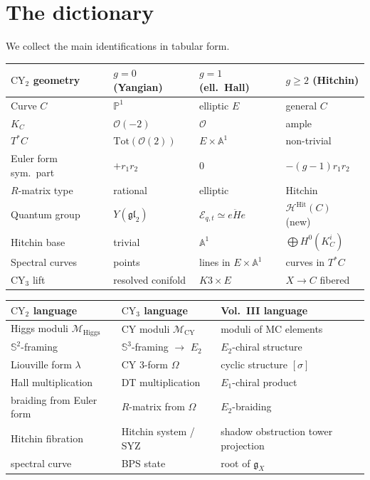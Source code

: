 \documentclass[11pt]{article}
\theoremstyle{garamondthm}
\theoremstyle{garamonddef}
\theoremstyle{garamondrem}
\newcommand{\CY}{\mathrm{CY}}
\newcommand{\Eone}{E_1}
\newcommand{\Etwo}{E_2}
\newcommand{\cE}{\mathcal{E}}
\newcommand{\cH}{\mathcal{H}}
\newcommand{\cM}{\mathcal{M}}
\newcommand{\cO}{\mathcal{O}}
\newcommand{\frakg}{\mathfrak{g}}
\newcommand{\Higgs}{\mathrm{Higgs}}
\newcommand{\Hit}{\mathrm{Hit}}
\newcommand{\Tot}{\mathrm{Tot}}
\begin{document}

\section{The dictionary}
\label{sec:dictionary}

We collect the main identifications in tabular form.

\begin{center}
\renewcommand{\arraystretch}{1.3}
\begin{tabular}{p{3cm}|p{3cm}|p{3cm}|p{3cm}}
\textbf{$\CY_2$ geometry} & \textbf{$g = 0$ (Yangian)} & \textbf{$g = 1$ (ell.\ Hall)} & \textbf{$g \geq 2$ (Hitchin)} \\ \hline
Curve $C$ & $\mathbb{P}^1$ & elliptic $E$ & general $C$ \\
$K_C$ & $\cO(-2)$ & $\cO$ & ample \\
$T^*C$ & $\Tot(\cO(2))$ & $E \times \mathbb{A}^1$ & non-trivial \\
Euler form sym.\ part & $+r_1 r_2$ & $0$ & $-(g{-}1)r_1 r_2$ \\
$R$-matrix type & rational & elliptic & Hitchin \\
Quantum group & $Y(\mathfrak{gl}_2)$ & $\cE_{q,t} \simeq e\ddot{H}e$ & $\cH^{\Hit}(C)$ (new) \\
Hitchin base & trivial & $\mathbb{A}^1$ & $\bigoplus H^0(K_C^i)$ \\
Spectral curves & points & lines in $E \times \mathbb{A}^1$ & curves in $T^*C$ \\
$\CY_3$ lift & resolved conifold & $K3 \times E$ & $X \to C$ fibered
\end{tabular}
\end{center}

\begin{center}
\renewcommand{\arraystretch}{1.3}
\begin{tabular}{p{4.5cm}|p{4.5cm}|p{4.5cm}}
\textbf{$\CY_2$ language} & \textbf{$\CY_3$ language} & \textbf{Vol.~III language} \\ \hline
Higgs moduli $\cM_{\Higgs}$ & CY moduli $\cM_{\mathrm{CY}}$ & moduli of MC elements \\
$\mathbb{S}^2$-framing & $\mathbb{S}^3$-framing $\to$ $\Etwo$ & $\Etwo$-chiral structure \\
Liouville form $\lambda$ & CY $3$-form $\Omega$ & cyclic structure $[\sigma]$ \\
Hall multiplication & DT multiplication & $\Eone$-chiral product \\
braiding from Euler form & $R$-matrix from $\Omega$ & $\Etwo$-braiding \\
Hitchin fibration & Hitchin system / SYZ & shadow obstruction tower projection \\
spectral curve & BPS state & root of $\frakg_X$
\end{tabular}
\end{center}
\end{document}
